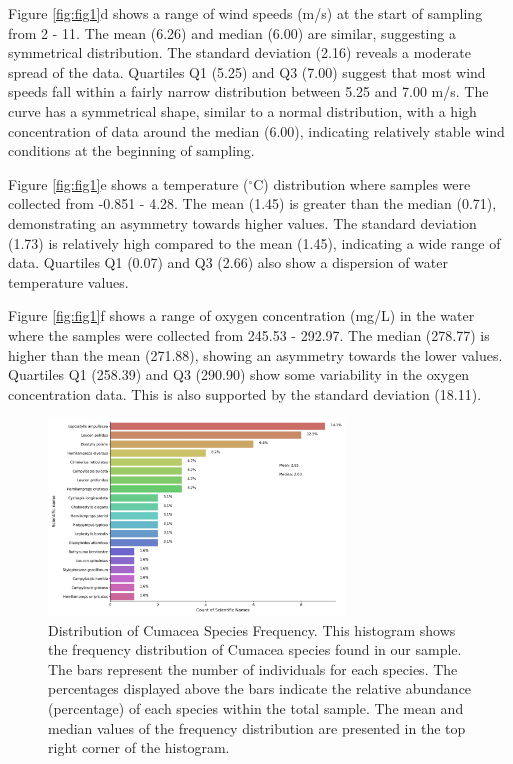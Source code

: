 Figure \ref{fig:fig1}d shows a range of wind speeds (m/s) at the start of sampling from 2 - 11. The mean (6.26) and median (6.00) are similar, suggesting a symmetrical distribution. The standard deviation (2.16) reveals a moderate spread of the data. Quartiles Q1 (5.25) and Q3 (7.00) suggest that most wind speeds fall within a fairly narrow distribution between 5.25 and 7.00 m/s. The curve has a symmetrical shape, similar to a normal distribution, with a high concentration of data around the median (6.00), indicating relatively stable wind conditions at the beginning of sampling. 

Figure \ref{fig:fig1}e shows a temperature ($^\circ$C) distribution where samples were collected from -0.851 - 4.28. The mean (1.45) is greater than the median (0.71), demonstrating an asymmetry towards higher values. The standard deviation (1.73) is relatively high compared to the mean (1.45), indicating a wide range of data. Quartiles Q1 (0.07) and Q3 (2.66) also show a dispersion of water temperature values.

Figure \ref{fig:fig1}f shows a range of oxygen concentration (mg/L) in the water where the samples were collected from 245.53 - 292.97. The median (278.77) is higher than the mean (271.88), showing an asymmetry towards the lower values. Quartiles Q1 (258.39) and Q3 (290.90) show some variability in the oxygen concentration data. This is also supported by the standard deviation (18.11).

\begin{figure}[htbp]
    \centering
    \includegraphics[width=0.7\textwidth]{figure2.jpg}
    \caption{Distribution of Cumacea Species Frequency. This histogram shows the frequency distribution of Cumacea species found in our sample. The bars represent the number of individuals for each species. The percentages displayed above the bars indicate the relative abundance (percentage) of each species within the total sample. The mean and median values of the frequency distribution are presented in the top right corner of the histogram. \label{fig:fig2}}
\end{figure}

